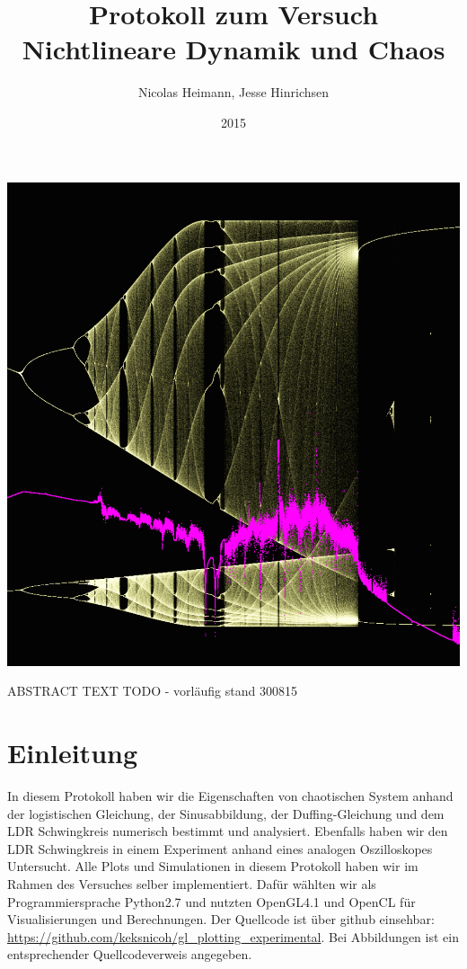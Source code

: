 \documentclass{scrartcl}
\title{Protokoll zum Versuch Nichtlineare Dynamik und Chaos}
\author{Nicolas Heimann, Jesse Hinrichsen}
\affil{\textit{Universität Hamburg}}
\date{2015}
\begin{document}
\maketitle
\begin{center}
\includegraphics[scale=0.25]{funfunfun} 
\end{center}

\begin{description}
\item ABSTRACT TEXT TODO - vorläufig stand 300815
\end{description}

\section{Einleitung}
In diesem Protokoll haben wir die Eigenschaften von chaotischen System anhand der logistischen Gleichung, der Sinusabbildung, der Duffing-Gleichung und dem LDR Schwingkreis numerisch bestimmt und analysiert. Ebenfalls haben wir den LDR Schwingkreis in einem Experiment anhand eines analogen Oszilloskopes Untersucht.
Alle Plots und Simulationen in diesem Protokoll haben wir im Rahmen des Versuches selber implementiert. Dafür wählten wir als Programmiersprache Python2.7 und nutzten OpenGL4.1 und OpenCL für Visualisierungen und Berechnungen. Der Quellcode ist über github einsehbar: \url{https://github.com/keksnicoh/gl_plotting_experimental}. Bei Abbildungen ist ein entsprechender Quellcodeverweis angegeben. 
\end{document}
